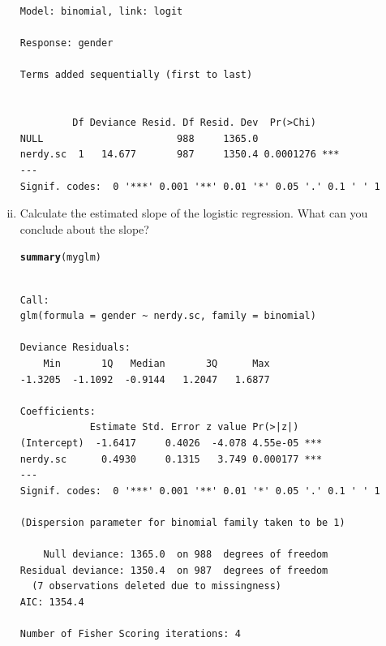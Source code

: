 \documentclass[12pt,a4paper]{article}\usepackage[]{graphicx}\usepackage[]{color}
\makeatletter
\newcommand{\hlstd}[1]{\textcolor[rgb]{0.345,0.345,0.345}{#1}}%
\newcommand{\hlkwd}[1]{\textcolor[rgb]{0.737,0.353,0.396}{\textbf{#1}}}%
\newenvironment{kframe}{%
 \def\at@end@of@kframe{}%
 \ifinner\ifhmode%
  \def\at@end@of@kframe{\end{minipage}}%
  \begin{minipage}{\columnwidth}%
 \fi\fi%
 \def\FrameCommand##1{\hskip\@totalleftmargin \hskip-\fboxsep
 \colorbox{shadecolor}{##1}\hskip-\fboxsep
     \hskip-\linewidth \hskip-\@totalleftmargin \hskip\columnwidth}%
 \MakeFramed {\advance\hsize-\width
   \@totalleftmargin\z@ \linewidth\hsize
   \@setminipage}}%
 {\par\unskip\endMakeFramed%
 \at@end@of@kframe}
\newenvironment{knitrout}{}{} %
\makeatother
\begin{document}
\begin{enumerate}[(i)]
\begin{knitrout}
\begin{kframe}
\begin{verbatim}
Model: binomial, link: logit

Response: gender

Terms added sequentially (first to last)


         Df Deviance Resid. Df Resid. Dev  Pr(>Chi)    
NULL                       988     1365.0              
nerdy.sc  1   14.677       987     1350.4 0.0001276 ***
---
Signif. codes:  0 '***' 0.001 '**' 0.01 '*' 0.05 '.' 0.1 ' ' 1
\end{verbatim}
\end{kframe}
\end{knitrout}
\item Calculate the estimated slope of the logistic regression. What can you conclude about the slope?
\begin{knitrout}
\color{fgcolor}\begin{kframe}
\begin{alltt}
\hlkwd{summary}\hlstd{(myglm)}
\end{alltt}
\begin{verbatim}

Call:
glm(formula = gender ~ nerdy.sc, family = binomial)

Deviance Residuals: 
    Min       1Q   Median       3Q      Max  
-1.3205  -1.1092  -0.9144   1.2047   1.6877  

Coefficients:
            Estimate Std. Error z value Pr(>|z|)    
(Intercept)  -1.6417     0.4026  -4.078 4.55e-05 ***
nerdy.sc      0.4930     0.1315   3.749 0.000177 ***
---
Signif. codes:  0 '***' 0.001 '**' 0.01 '*' 0.05 '.' 0.1 ' ' 1

(Dispersion parameter for binomial family taken to be 1)

    Null deviance: 1365.0  on 988  degrees of freedom
Residual deviance: 1350.4  on 987  degrees of freedom
  (7 observations deleted due to missingness)
AIC: 1354.4

Number of Fisher Scoring iterations: 4
\end{verbatim}
\end{kframe}
\end{knitrout}
\end{enumerate}
\end{document}
